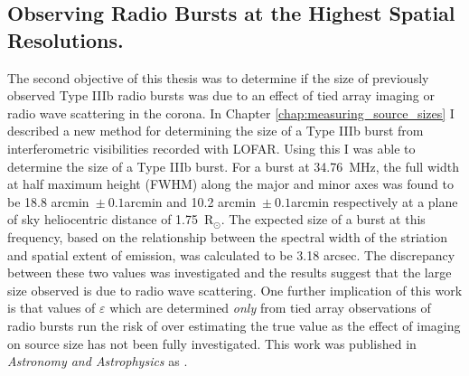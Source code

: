 \subsection{Observing Radio Bursts at the Highest Spatial Resolutions.}
The second objective of this thesis was to determine if the size of previously observed Type IIIb radio bursts was due to an effect of tied array imaging or radio wave scattering in the corona. In Chapter \ref{chap:measuring_source_sizes} I described a new method for determining the size of a Type IIIb burst from interferometric visibilities recorded with LOFAR. Using this I was able to determine the size of a Type IIIb burst. For a burst at 34.76~MHz, the full width at half maximum height (FWHM) along the major and minor axes was found to be 18.8 arcmin~$\pm~0.1$arcmin and 10.2 arcmin~$\pm~0.1$arcmin respectively at a plane of sky heliocentric distance of 1.75~R$_\odot$. The expected size of a burst at this frequency, based on the relationship between the spectral width of the striation and spatial extent of emission, was calculated to be 3.18 arcsec. The discrepancy between these two values was investigated and the results suggest that the large size observed is due to radio wave scattering. One further implication of this work is that values of $\varepsilon$ which are determined \textit{only} from tied array observations of radio bursts run the risk of over estimating the true value as the effect of imaging on source size has not been fully investigated. This work was published in \textit{Astronomy and Astrophysics} as \cite{Murphy2021}.

